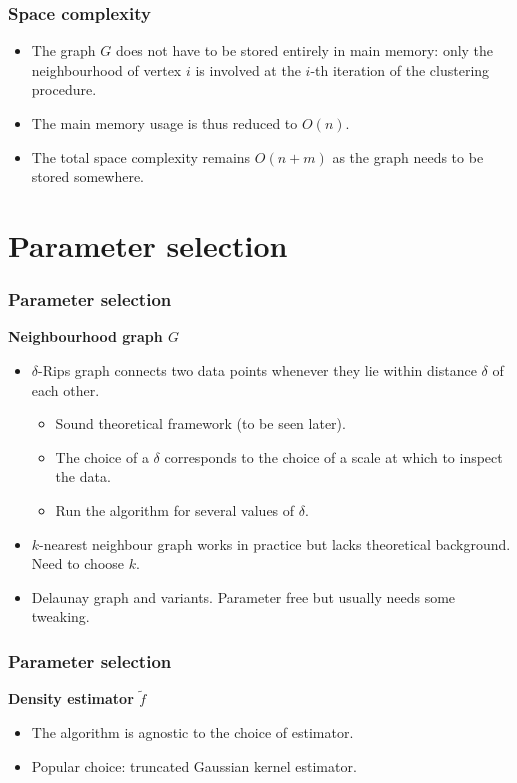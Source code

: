 \documentclass{beamer}
\theoremstyle{definition}
\begin{document}
\begin{frame}
\frametitle{Space complexity}
\begin{itemize}
\item<1-> The graph $G$ does not have to be stored entirely in main memory: only the neighbourhood of vertex $i$ is involved at the
$i$-th iteration of the clustering procedure. 

\item<2-> The main memory usage is thus reduced to $O(n)$.

\item<3-> The total space complexity remains $O(n + m)$ as the graph needs to be stored somewhere.
\end{itemize}
\end{frame}

\section{Parameter selection}
\begin{frame}
\frametitle{Parameter selection}
\textbf{Neighbourhood graph $G$}
\begin{itemize}
\item<1-> $\delta$-Rips graph connects two data points whenever they lie within distance $\delta$ of each other.
\begin{itemize}
\item<2-> Sound theoretical framework (to be seen later).
\item<3-> The choice of a $\delta$ corresponds to the choice of a scale at which to inspect the data.
\item<4-> Run the algorithm for several values of $\delta$. %
\end{itemize}
\item<5-> $k$-nearest neighbour graph works in practice but lacks theoretical background. Need to choose $k$.
\item<6-> Delaunay graph and variants. Parameter free but usually needs some tweaking.
\end{itemize}
\end{frame}

\begin{frame}
\frametitle{Parameter selection}
\textbf{Density estimator $\tilde{f}$}
\begin{itemize}
\item<1-> The algorithm is agnostic to the choice of estimator. 
\item<2-> Popular choice: truncated Gaussian kernel estimator. %
\end{itemize}
\end{frame}
\end{document}
